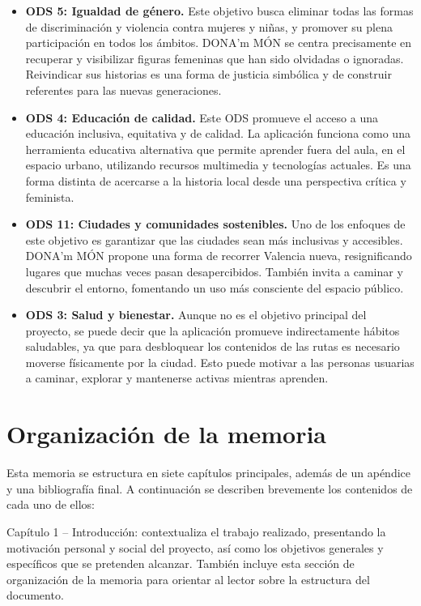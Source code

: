 \begin{itemize}
    \item \textbf{ODS 5: Igualdad de género.} Este objetivo busca eliminar todas las formas de discriminación y violencia contra mujeres y niñas, y promover su plena participación en todos los ámbitos. DONA'm MÓN se centra precisamente en recuperar y visibilizar figuras femeninas que han sido olvidadas o ignoradas. Reivindicar sus historias es una forma de justicia simbólica y de construir referentes para las nuevas generaciones.

    \item \textbf{ODS 4: Educación de calidad.} Este ODS promueve el acceso a una educación inclusiva, equitativa y de calidad. La aplicación funciona como una herramienta educativa alternativa que permite aprender fuera del aula, en el espacio urbano, utilizando recursos multimedia y tecnologías actuales. Es una forma distinta de acercarse a la historia local desde una perspectiva crítica y feminista.

    \item \textbf{ODS 11: Ciudades y comunidades sostenibles.} Uno de los enfoques de este objetivo es garantizar que las ciudades sean más inclusivas y accesibles. DONA'm MÓN propone una forma de recorrer Valencia nueva, resignificando lugares que muchas veces pasan desapercibidos. También invita a caminar y descubrir el entorno, fomentando un uso más consciente del espacio público.

    \item \textbf{ODS 3: Salud y bienestar.} Aunque no es el objetivo principal del proyecto, se puede decir que la aplicación promueve indirectamente hábitos saludables, ya que para desbloquear los contenidos de las rutas es necesario moverse físicamente por la ciudad. Esto puede motivar a las personas usuarias a caminar, explorar y mantenerse activas mientras aprenden.
\end{itemize}

    
\section{Organización de la memoria}
Esta memoria se estructura en siete capítulos principales, además de un apéndice y una bibliografía final. A continuación se describen brevemente los contenidos de cada uno de ellos:

Capítulo 1 – Introducción: contextualiza el trabajo realizado, presentando la motivación personal y social del proyecto, así como los objetivos generales y específicos que se pretenden alcanzar. También incluye esta sección de organización de la memoria para orientar al lector sobre la estructura del documento.

